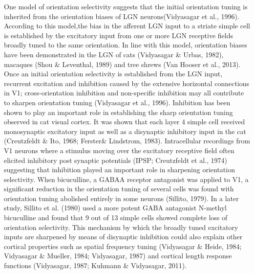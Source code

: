 	One model of orientation selectivity suggests that the initial orientation tuning is inherited from the orientation biases of LGN neurons(Vidyasagar et al., 1996). According to this model,the bias in the afferent LGN input to a striate simple cell is established by the excitatory input from one or more LGN receptive fields broadly tuned to the same orientation. In line with this model, orientation biases have been demonstrated in the LGN of cats (Vidyasagar \& Urbas, 1982), macaques (Shou \& Leventhal, 1989) and tree shrews (Van Hooser et al., 2013). Once an initial orientation selectivity is established from the LGN input, recurrent excitation and inhibition caused by the extensive horizontal connections in V1; cross-orientation inhibition and non-specific inhibition may all contribute to sharpen orientation tuning (Vidyasagar et al., 1996).
	Inhibition has been shown to play an important role in establishing the sharp orientation tuning observed in cat visual cortex. It was shown that each layer 4 simple cell received monosynaptic excitatory input as well as a disynaptic inhibitory input in the cat (Creutzfeldt \& Ito, 1968; Ferster\& Lindstrom, 1983). Intracellular recordings from V1 neurons where a stimulus moving over the excitatory receptive field often elicited inhibitory post synaptic potentials (IPSP; Creutzfeldt et al., 1974) suggesting that inhibition played an important role in sharpening orientation selectivity. When bicuculline, a GABAA receptor antagonist was applied to V1, a significant reduction in the orientation tuning of several cells was found with orientation tuning abolished entirely in some neurons (Sillito, 1979). In a later study, Sillito et al. (1980) used a more potent GABA antagonist N-methyl bicuculline and found that 9 out of 13 simple cells showed complete loss of orientation selectivity. This mechanism by which the broadly tuned excitatory inputs are sharpened by means of disynaptic inhibition could also explain other cortical properties such as spatial frequency tuning (Vidyasagar \& Heide, 1984; Vidyasagar \& Mueller, 1984; Vidyasagar, 1987) and cortical length response functions (Vidyasagar, 1987; Kuhmann \& Vidyasagar, 2011).
